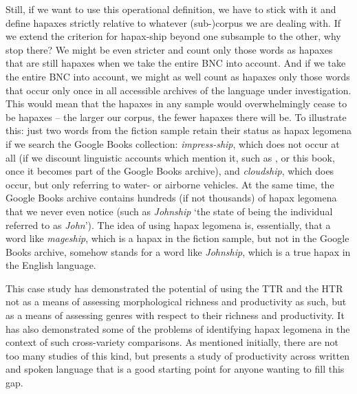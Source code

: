Still, if we want to use this operational  definition, we have to stick with it and define hapaxes strictly relative to whatever (sub-)corpus we are dealing with. If we extend the criterion for hapax\hyp{}ship beyond one subsample to the other, why stop there? We might be even stricter and count only those words as hapaxes  that are still hapaxes when we take the entire BNC  into account. And if we take the entire BNC into account, we might as well count as hapaxes only those words that occur only once in all accessible archives of the language under investigation. This would mean that the hapaxes in any sample would overwhelmingly cease to be hapaxes -- the larger  our corpus, the fewer hapaxes there will be. To illustrate this: just two words from the fiction  sample retain their status as hapax legomena if we search the Google Books collection: \textit{impress\hyp{}ship}, which does not occur at all (if we discount linguistic accounts which mention it, such as \citet{trips_lexical_2009}, or this book, once it becomes part of the Google Books archive), and \textit{cloudship}, which does occur, but only referring to water- or airborne vehicles. At the same time, the Google Books archive contains hundreds (if not thousands) of hapax  legomena that we never even notice (such as \textit{Johnship} `the state of being the individual referred to as \textit{John}'). The idea of using hapax legomena is, essentially, that a word like \textit{mageship}, which is a hapax in the fiction  sample, but not in the Google Books archive, somehow stands for a word like \textit{Johnship}, which is a true hapax in the English language.

This case study has demonstrated the potential of using the TTR  and the HTR  not as a means of assessing morphological  richness and productivity  as such, but as a means of assessing genres  with respect to their richness and productivity. It has also demonstrated some of the problems of identifying hapax  legomena in the context of such cross\hyp{}variety  comparisons. As mentioned initially, there are not too many studies of this kind, but \citet{plag_morphological_1999} presents a study of productivity  across written  and spoken language that is a good starting point for anyone wanting to fill this gap.

